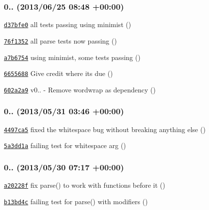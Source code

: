 \subsubsection*{0.. (2013/06/25 08\+:48 +00\+:00)}


\begin{DoxyItemize}
\item \href{https://github.com/bcoe/yargs/commit/d37bfe05ae6d295a0ab481efe4881222412791f4}{\tt d37bfe0} all tests passing using minimist ()
\item \href{https://github.com/bcoe/yargs/commit/76f135270399d01f2bbc621e524a5966e5c422fd}{\tt 76f1352} all parse tests now passing ()
\item \href{https://github.com/bcoe/yargs/commit/a7b6754276c38d1565479a5685c3781aeb947816}{\tt a7b6754} using minimist, some tests passing ()
\item \href{https://github.com/bcoe/yargs/commit/66556882aa731cbbbe16cc4d42c85740a2e98099}{\tt 6655688} Give credit where its due ()
\item \href{https://github.com/bcoe/yargs/commit/602a2a92a459f93704794ad51b115bbb08b535ce}{\tt 602a2a9} v0.. -\/ Remove wordwrap as dependency ()
\end{DoxyItemize}

\subsubsection*{0.. (2013/05/31 03\+:46 +00\+:00)}


\begin{DoxyItemize}
\item \href{https://github.com/bcoe/yargs/commit/4497ca55e332760a37b866ec119ded347ca27a87}{\tt 4497ca5} fixed the whitespace bug without breaking anything else ()
\item \href{https://github.com/bcoe/yargs/commit/5a3dd1a4e0211a38613c6e02f61328e1031953fa}{\tt 5a3dd1a} failing test for whitespace arg ()
\end{DoxyItemize}

\subsubsection*{0.. (2013/05/30 07\+:17 +00\+:00)}


\begin{DoxyItemize}
\item \href{https://github.com/bcoe/yargs/commit/a20228f62a454755dd07f628a7c5759113918327}{\tt a20228f} fix parse() to work with functions before it ()
\item \href{https://github.com/bcoe/yargs/commit/b13bd4cac856a9821d42fa173bdb58f089365a7d}{\tt b13bd4c} failing test for parse() with modifiers ()
\end{DoxyItemize}

